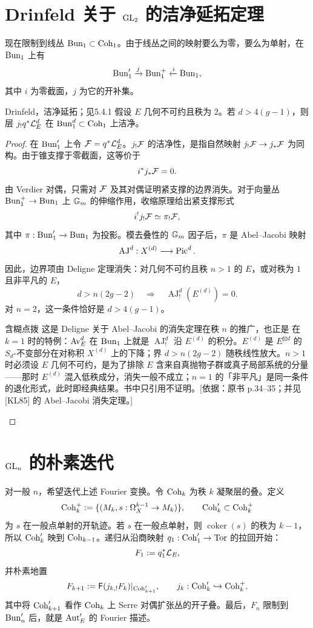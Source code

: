 \section{Drinfeld 关于 \texorpdfstring{$\operatorname{GL}_2$}{GL₂} 的洁净延拓定理}\label{sec:5.4}
现在限制到线丛 $\operatorname{Bun}_1\subset\operatorname{Coh}_1$。由于线丛之间的映射要么为零，要么为单射，在 $\operatorname{Bun}_1$ 上有
\[\operatorname{Bun}'_1\xrightarrow{j}\operatorname{Bun}_1^+\xleftarrow{i}\operatorname{Bun}_1,\]
其中 $i$ 为零截面，$j$ 为它的开补集。
\begin{theorem}{Drinfeld，洁净延拓；见\cite{FGKV98,KL85}}{5.4.1}
假设 $E$ 几何不可约且秩为 $2$。若 $d>4(g-1)$，则层 $j_!q^*\mathcal{L}_E^d$ 在 $\operatorname{Bun}_1^d\subset\operatorname{Coh}_1$ 上洁净。
\end{theorem}
\begin{proof}

在 $\operatorname{Bun}'_1$ 上令 $\mathcal{F}=q^*\mathcal{L}_E^d$。$j_!\mathcal{F}$ 的洁净性，是指自然映射 $j_!\mathcal{F}\to j_*\mathcal{F}$ 为同构。由于锥支撑于零截面，这等价于
\[i^*j_*\mathcal{F}=0.\]
由 Verdier 对偶，只需对 $\mathcal{F}$ 及其对偶证明紧支撑的边界消失。对于向量丛 $\operatorname{Bun}_1^+\to\operatorname{Bun}_1$ 上 $\mathbb{G}_{m}$ 的伸缩作用，收缩原理给出紧支撑形式
\[i^!j_!\mathcal{F}\simeq\pi_!\mathcal{F},\]
其中 $\pi:\operatorname{Bun}'_1\to\operatorname{Bun}_1$ 为投影。模去叠性的 $\mathbb{G}_{m}$ 因子后，$\pi$ 是 Abel–Jacobi 映射
\[\operatorname{AJ}^d:X^{(d)}\longrightarrow\operatorname{Pic}^d.\]
因此，边界项由 Deligne 定理消失：对几何不可约且秩 $n>1$ 的 $E$，或对秩为 $1$ 且非平凡的 $E$，
\[d>n(2g-2)\quad\Longrightarrow\quad\operatorname{AJ}_!^d(E^{(d)})=0.\]
对 $n=2$，这一条件恰好是 $d>4(g-1)$。
\begin{transnote}{含糊点拨}
这是 Deligne 关于 Abel–Jacobi 的消失定理在秩 $n$ 的推广，也正是  在 $k=1$ 时的特例：$\operatorname{Av}_E^d$ 在 $\operatorname{Bun}_1$ 上就是 $\operatorname{AJ}^d_!$ 沿 $E^{(d)}$ 的积分。$E^{(d)}$ 是 $E^{\boxtimes d}$ 的 $S_d$-不变部分在对称积 $X^{(d)}$ 上的下降；界 $d>n(2g-2)$ 随秩线性放大。$n>1$ 时必须设 $E$ 几何不可约，是为了排除 $E$ 含来自真抛物子群或真子局部系统的分量——那时 $E^{(d)}$ 混入低秩成分，消失一般不成立；$n=1$ 的「非平凡」是同一条件的退化形式，此时即经典结果。书中只引用不证明。[依据：原书 p.34–35；并见 [KL85] 的 Abel–Jacobi 消失定理。]
\end{transnote}
\end{proof}
\section{\texorpdfstring{$\operatorname{GL}_n$}{GLₙ} 的朴素迭代}\label{sec:5.5}
对一般 $n$，希望迭代上述 Fourier 变换。令 $\operatorname{Coh}_k$ 为秩 $k$ 凝聚层的叠。定义
\[\operatorname{Coh}_k^+:=\{(M_k,s:\Omega_X^{k-1}\to M_k)\},\qquad\operatorname{Coh}'_k\subset\operatorname{Coh}_k^+\]
为 $s$ 在一般点单射的开轨迹。若 $s$ 在一般点单射，则 $\operatorname{coker}(s)$ 的秩为 $k-1$，所以 $\operatorname{Coh}'_k$ 映到 $\operatorname{Coh}_{k-1}$。递归从沿商映射 $q_1:\operatorname{Coh}'_1\to\operatorname{Tor}$ 的拉回开始：
\[F_1:=q_1^*\mathcal{L}_E,\]
并朴素地置
\[F_{k+1}:=\mathsf F(j_{k,!}F_k)|_{\operatorname{Coh}'_{k+1}},\qquad j_k:\operatorname{Coh}'_k\hookrightarrow\operatorname{Coh}_k^+,\]
其中将 $\operatorname{Coh}'_{k+1}$ 看作 $\operatorname{Coh}_k$ 上 Serre 对偶扩张丛的开子叠。最后，$F_n$ 限制到 $\operatorname{Bun}'_n$ 后，就是 $\operatorname{Aut}'_E$ 的 Fourier 描述。

